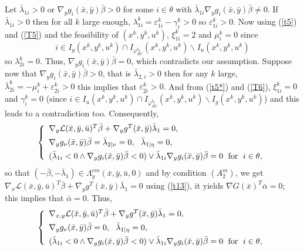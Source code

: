 Let $\bar{\lambda}_{1i}>0$ or $\nabla_{y}
	g_{i}(\bar{x},\bar{y})\bar{\beta}>0$ for some $i\in\theta$ with $\bar{\lambda
	}_{1i}\nabla_{y}g_{i}(\bar{x},\bar{y})\bar{\beta}\neq0.$ If $\bar{\lambda
	}_{1i}>0$ then for all $k$ large enough, $\lambda_{1i}^{k}=\varepsilon
	_{1i}^{k}-\gamma_{i}^{k}>0$ so $\varepsilon_{1i}^{k}>0.$ Now using (\ref{t5})
	and (\ref{T5}) and the feasibility of $(x^{k},y^{k},u^{k})$,  $\xi
	_{1i}^{k}=2$ and $\mu_{i}^{k}=0$ since 
    \[i\in I_{g}(x^{k},y^{k},u^{k})\cap I_{\varphi^{t_{k}} _{SU}
	}(x^{k},y^{k},u^{k})\backslash I_{u}(x^{k}
	,y^{k},u^{k})
    \]
    so $\lambda_{2i}^{k}=0$. Thus, $\nabla_{y}g_{i}
	(\bar{x},\bar{y})\bar{\beta}=0$,  which contradicts our assumption. Suppose now
	that $\nabla_{y}g_{i}(\bar{x},\bar{y})\bar{\beta}>0$, that is $\bar{\lambda
	}_{2,i}>0$ then for any $k$ large, $\bar{\lambda}_{2i}^{k}=-\mu_{i}^{k}
	+\varepsilon_{2i}^{k}>0$ this implies that $\varepsilon_{2i}^{k}>0.$ And from
	(\ref{t5*}) and (\ref{T6}), $\xi_{1i}^{k}=0$ and $\gamma_{i}^{k}=0$ (since
	$i\in I_{u}(x^{k},y^{k},u^{k})\cap I_{\varphi^{t_{k}} _{SU}
	}(x^{k},y^{k},u^{k})\backslash I_{g}(x^{k},y^{k},u^{k})$) and this leads to a
	contradiction too.
	Consequently, 
	\[
	\left\{
	\begin{array}
	[c]{l}
	\nabla_{y}\mathcal{L}(\bar{x},\bar{y},\bar{u})^{T}\bar{\beta}+\nabla_{y}
	g^{T}(\bar{x},\bar{y})\bar{\lambda}_{1}=0,\\[1ex]
	\nabla_{y}g_{\nu}(\bar{x},\bar{y})\bar{\beta}=\bar{\lambda}_{2\mid\nu
	}=0,\text{ \ }\bar{\lambda}_{1\mid\eta}=0,\\[1ex]
	(\bar{\lambda}_{1i}<0\wedge\nabla_{y}g_{i}(\bar{x},\bar{y})\bar{\beta}
	<0)\vee\bar{\lambda}_{1i}\nabla_{y}g_{i}(\bar{x},\bar{y})\bar{\beta
	}=0\;\mbox{ for }\;i\in\theta,
	\end{array}
	\right.
	\]
	so that $(-\bar{\beta},-\bar{\lambda}_{1})\in\Lambda_{y}^{em}(\bar{x},\bar
	{y},\bar{u},0)$ and by condition $(A_{2}^{m})$, we get
	$
	\nabla_{x}\mathcal{L}(\bar{x},\bar{y},\bar{u})^{T}\bar{\beta}+\nabla_{y}%
	g^{T}(\bar{x},\bar{y})\bar{\lambda}_{1}=0
	$
	using (\ref{t13}), it yields $\nabla G(\bar{x})^{T}\bar{\alpha}=0$; this
	implies that $\bar{\alpha}=0$. Thus,
	\[
	\left\{
	\begin{array}
	[c]{l}
	\nabla_{x,y}\mathcal{L}(\bar{x},\bar{y},\bar{u})^{T}\bar{\beta}+\nabla
	_{y}g^{T}(\bar{x},\bar{y})\bar{\lambda}_{1}=0,\\[1ex]
	\nabla_{y}g_{\nu}(\bar{x},\bar{y})\bar{\beta}=0,\text{ \ }\bar{\lambda}
	_{1\mid\eta}=0,\\[1ex]
	(\bar{\lambda}_{1i}<0\wedge\nabla_{y}g_{i}(\bar{x},\bar{y})\bar{\beta}
	<0)\vee\bar{\lambda}_{1i}\nabla_{y}g_{i}(\bar{x},\bar{y})\bar{\beta
	}=0\;\mbox{ for }\;i\in\theta,
	\end{array}
	\right.
	\]
